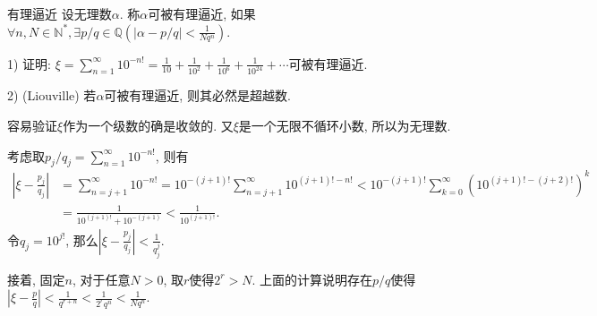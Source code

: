 \begin{exercise}{有理逼近}
	设无理数$\alpha$. 称$\alpha$可被有理逼近, 如果$\forall n,N \in \mathbb{N}^{*}, \exists p/q \in \mathbb{Q} \left(|\alpha - p/q | < \frac{1}{Nq^n} \right)$. 
	
	1) 证明: $\xi = \sum_{n=1}^{\infty} 10^{-n!} = \frac{1}{10} + \frac{1}{10^2} + \frac{1}{10^6}+\frac{1}{10^{24}} + \cdots$可被有理逼近. 
	
	2) (Liouville) 若$\alpha$可被有理逼近, 则其必然是超越数. 
\end{exercise}
\begin{solution}
	容易验证$\xi$作为一个级数的确是收敛的. 又$\xi$是一个无限不循环小数, 所以为无理数.
	
	考虑取$p_j/q_j = \sum_{n=1}^{\infty} 10^{-n!}$, 则有
	\begin{align*}
		\left| \xi - \frac{p_j}{q_j} \right| &= \sum_{n=j+1}^{\infty} 10^{-n!} = 10^{-(j+1)!} \sum_{n=j+1}^{\infty} 10^{(j+1)!-n!} < 10^{-(j+1)!} \sum_{k=0}^{\infty} \left( 10^{(j+1)!-(j+2)!} \right)^k \\
		&= \frac{1}{10^{(j+1)!} + 10^{-(j+1)}} < \frac{1}{10^{(j+1)!}}.
	\end{align*}
	令$q_j=10^{j!}$, 那么$|\xi - \frac{p_j}{q_j}| < \frac{1}{q_j^j}$. 
	
	接着, 固定$n$, 对于任意$N>0$, 取$r$使得$2^r>N$. 上面的计算说明存在$p/q$使得$|\xi - \frac{p}{q} |< \frac{1}{q^{r+n}} < \frac{1}{2^r q^n} < \frac{1}{Nq^n}$. 
\end{solution}
